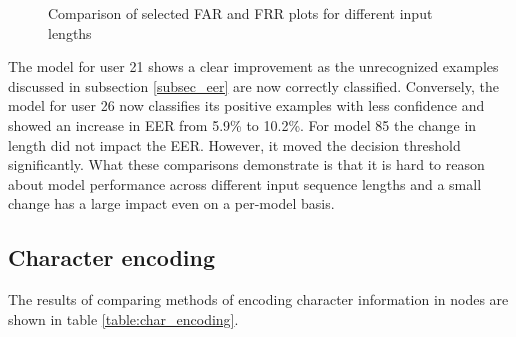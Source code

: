 \begin{figure}[H]
	\centering

	\caption{Comparison of selected FAR and FRR plots for different input lengths}%
	\label{fig:selected_frr_vs_far}%
\end{figure}

The model for user 21 shows a clear improvement as the unrecognized examples discussed in subsection \ref{subsec_eer} are now correctly classified. Conversely, the model for user 26 now classifies its positive examples with less confidence and showed an increase in EER from 5.9\% to 10.2\%. For model 85 the change in length did not impact the EER. However, it moved the decision threshold significantly.
What these comparisons demonstrate is that it is hard to reason about model performance across different input sequence lengths and a small change has a large impact even on a per-model basis.

\subsection{Character encoding}
The results of comparing methods of encoding character information in nodes are shown in table
\ref{table:char_encoding}.

